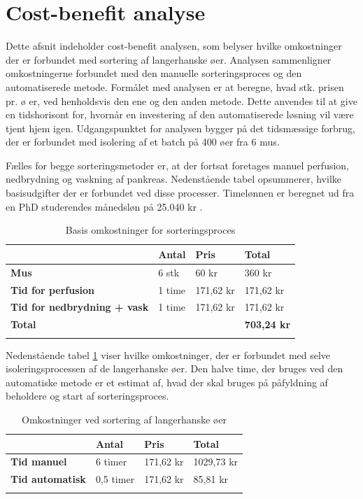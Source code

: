 
\section{Cost-benefit analyse}
Dette afsnit indeholder cost-benefit analysen, som belyser hvilke omkostninger der er forbundet med sortering af langerhanske øer. Analysen sammenligner omkostningerne forbundet med den manuelle sorteringsproces og den automatiserede metode. Formålet med analysen er at beregne, hvad stk. prisen pr. ø er, ved henholdsvis den ene og den anden metode. Dette anvendes til at give en tidshorisont for, hvornår en investering af den automatiserede løsning vil være tjent hjem igen. Udgangspunktet for analysen bygger på det tidsmæssige forbrug, der er forbundet med isolering af et batch på 400 øer fra 6 mus. 

Fælles for begge sorteringsmetoder er, at der fortsat foretages manuel perfusion, nedbrydning og vaskning af pankreas. Nedenstående tabel opsummerer, hvilke basisudgifter der er forbundet ved disse processer. Timelønnen er beregnet ud fra en PhD studerendes månedsløn på 25.040 kr \citep{phdwage}.
\begin{center}
		\begin{longtable}{ | m{6cm} | m{1.5cm} | m{1.5cm} | m{3cm}| } 
			\hline
			 &\textbf{Antal} & \textbf{Pris} & \textbf{Total}\\ 
			\hline
			 \textbf{Mus} & 6 stk & 60 kr & 360 kr\\ 
			\hline
			 \textbf{Tid for perfusion} & 1 time & 171,62 kr & 171,62 kr\\ 
			\hline
			\textbf{Tid for nedbrydning + vask} & 1 time & 171,62 kr & 171,62 kr\\ 
			\hline	
			\textbf{Total} &  &  & \textbf{703,24 kr}\\ 
			\hline
			\caption{Basis omkostninger for sorteringsproces}
			 		\end{longtable}
\end{center}
Nedenstående tabel \ref{tab:sortcost} viser hvilke omkostninger, der er forbundet med selve isoleringsprocessen af de langerhanske øer. Den halve time, der bruges ved den automatiske metode er et estimat af, hvad der skal bruges på påfyldning af beholdere og start af sorteringsproces. 
\begin{center}
		\begin{longtable}{ | m{6cm} | m{1.5cm} | m{1.5cm} | m{3cm}| } 
			\hline
			 &\textbf{Antal} & \textbf{Pris} & \textbf{Total}\\ 
			\hline
			 \textbf{Tid manuel} & 6 timer & 171,62 kr & 1029,73 kr\\ 
			\hline
			 \textbf{Tid automatisk} & 0,5 timer & 171,62 kr & 85,81 kr\\ 
			\hline
			\caption{Omkostninger ved sortering af langerhanske øer}
			\label{tab:sortcost}
			 		\end{longtable}
\end{center}
